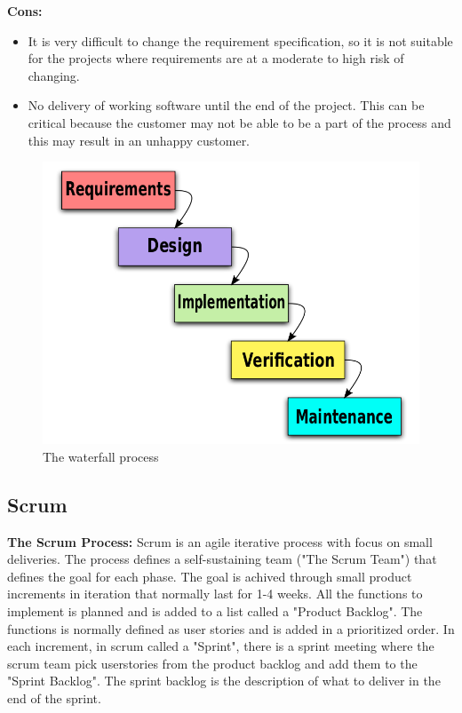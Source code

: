 {\bf Cons: }
\begin{itemize}
	\item It is very difficult to change the requirement specification, so it is not suitable for the projects where requirements are at a moderate to high risk of changing.
	\item No delivery of working software until the end of the project. This can be critical because the customer may not
	be able to be a part of the process and this may result in an unhappy customer.
\end{itemize}

\begin{figure}[!ht]
\centering
\includegraphics[scale=0.3]{pictures/Waterfall_model.png}
\caption{The waterfall process}
\label{overflow}
\end{figure}


\subsection{Scrum}
{\bf The Scrum Process: } Scrum is an agile iterative process with focus on small deliveries. The process
defines a self-sustaining team ("The Scrum Team") that defines the goal for each phase. The goal 
is achived through small product increments in iteration that normally last for 1-4 weeks. 
All the functions to implement is planned and is added to a list called a "Product Backlog". The
functions is normally defined as user stories and is added in a prioritized order. In each increment, 
in scrum called a "Sprint", there is a sprint meeting where the scrum team pick userstories from the 
product backlog and add them to the "Sprint Backlog". The sprint backlog is the description of what 
to deliver in the end of the sprint.

